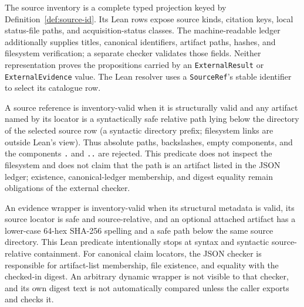 \begin{definition}
  \label{def:source-inventory}
  \leanok
  The source inventory is a complete typed projection keyed by
  Definition~\ref{def:source-id}.  Its Lean rows expose source kinds,
  citation keys, local status-file paths, and acquisition-status classes.  The
  machine-readable ledger additionally supplies titles, canonical identifiers,
  artifact paths, hashes, and filesystem verification; a separate
  checker validates those fields.  Neither representation proves the
  propositions carried by an \texttt{ExternalResult} or
  \texttt{ExternalEvidence} value.  The Lean resolver uses a
  \texttt{SourceRef}'s stable identifier to select its catalogue row.
\end{definition}

\begin{definition}
  \label{def:inventory-valid-source-ref}
  \leanok
  A source reference is inventory-valid when it is structurally valid and any
  artifact named by its locator is a syntactically safe relative path lying
  below the directory of the selected source row (a syntactic directory
  prefix; filesystem links are outside Lean's view).  Thus absolute paths,
  backslashes, empty components, and the components \texttt{.} and
  \texttt{..} are rejected.  This predicate does not inspect the filesystem
  and does not claim that the path is an artifact listed in the JSON ledger;
  existence, canonical-ledger membership, and digest equality remain
  obligations of the external checker.
\end{definition}

\begin{definition}
  \label{def:inventory-valid-evidence}
  \leanok
  An evidence wrapper is inventory-valid when its structural metadata is
  valid, its source locator is safe and source-relative, and an optional
  attached artifact has a lower-case 64-hex SHA-256 spelling and a safe path
  below the same source directory.  This Lean predicate intentionally stops at
  syntax and syntactic source-relative containment.  For canonical claim
  locators, the JSON checker is responsible for artifact-list membership, file
  existence, and equality with the checked-in digest.  An arbitrary dynamic
  wrapper is not visible to that checker, and its own digest text is not
  automatically compared unless the caller exports and checks it.
\end{definition}

